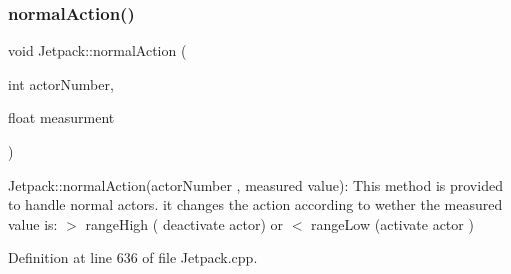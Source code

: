 \subsubsection{\texorpdfstring{normal\+Action()}{normalAction()}}
{\footnotesize\ttfamily void Jetpack\+::normal\+Action (\begin{DoxyParamCaption}\item[{int}]{actor\+Number,  }\item[{float}]{measurment }\end{DoxyParamCaption})}

Jetpack\+::normal\+Action(actor\+Number , measured value)\+: This method is provided to handle normal actors. it changes the action according to wether the measured value is\+: $>$ range\+High ( deactivate actor) or $<$ range\+Low (activate actor ) 

Definition at line 636 of file Jetpack.\+cpp.



